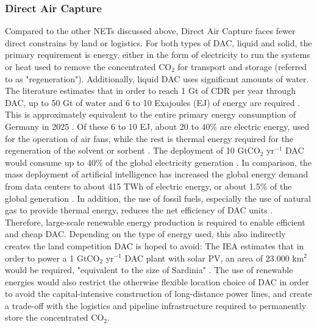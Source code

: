 \subsubsection{Direct Air Capture}
Compared to the other NETs discussed above, Direct Air Capture faces fewer direct constrains by land or logistics. For both types of DAC, liquid and solid, the primary requirement is energy, either in the form of electricity to run the systems or heat used to remove the concentrated CO$_2$ for transport and storage (referred to as "regeneration"). Additionally, liquid DAC uses significant amounts of water. The literature estimates that in order to reach 1 Gt of CDR per year through DAC, up to 50 Gt of water and 6 to 10 Exajoules (EJ) of energy are required \parencite{iea_direct_2022, ozkan_atmospheric_2024}. This is approximately equivalent to the entire primary energy consumption of Germany in 2025 \parencite{bdew_energieversorgung_2025}. Of these 6 to 10 EJ, about 20 to 40\% are electric energy, used for the operation of air fans, while the rest is thermal energy required for the regeneration of the solvent or sorbent \parencite{ozkan_atmospheric_2024, nas_negative_2018}. The deployment of 10 GtCO$_2$ yr$^{-1}$ DAC would consume up to 40\% of the global electricity generation \parencite{herzog_getting_2024}. In comparison, the mass deployment of artificial intelligence has increased the global energy demand from data centers to about 415 TWh of electric energy, or about 1.5\% of the global generation \parencite{iea_energy_2025}. In addition, the use of fossil fuels, especially the use of natural gas to provide thermal energy, reduces the net efficiency of DAC units \parencite{eke_comprehensive_2025}. Therefore, large-scale renewable energy production is required to enable efficient and cheap DAC. Depending on the type of energy used, this also indirectly creates the land competition DAC is hoped to avoid: The IEA estimates that in order to power a 1 GtCO$_2$ yr$^{-1}$ DAC plant with solar PV, an area of 23.000 km$^2$ would be required, "equivalent to the size of Sardinia" \parencite{iea_direct_2022}. The use of renewable energies would also restrict the otherwise flexible location choice of DAC in order to avoid the capital-intensive construction of long-distance power lines, and create a trade-off with the logistics and pipeline infrastructure required to permanently store the concentrated CO$_2$. \vspace{2mm}

